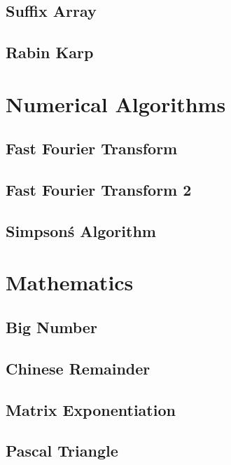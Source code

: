 \subsection{Suffix Array}
\raggedbottom
\hrulefill
\subsection{Rabin Karp}
\raggedbottom
\hrulefill

\section{Numerical Algorithms}
\subsection{Fast Fourier Transform}
\raggedbottom
\hrulefill
\subsection{Fast Fourier Transform 2}
\raggedbottom
\hrulefill
\subsection{Simpson\'s Algorithm}
\raggedbottom
\hrulefill

\section{Mathematics}
\subsection{Big Number}
\raggedbottom
\hrulefill
\subsection{Chinese Remainder}
\raggedbottom
\hrulefill
\subsection{Matrix Exponentiation}
\raggedbottom
\hrulefill
\subsection{Pascal Triangle}
\raggedbottom
\hrulefill
